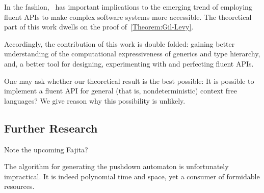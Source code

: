 In the fashion,~ has important
  implications to the emerging trend of employing fluent APIs
  to make complex software systems more accessible.
The theoretical part of this work dwells on the proof of~\cref{Theorem:Gil-Levy}.

Accordingly, the contribution of this work is double folded:
  gaining better understanding of the computational expressiveness of
  \Java generics and type hierarchy, and, a better tool
  for designing, experimenting with and perfecting fluent APIs.

One may ask whether our theoretical result is the
  best possible:
It is possible to implement a fluent API for general
  (that is, nondeterministic) context free languages?
  We give reason why this possibility is unlikely.

\subsection{Further Research}
Note the upcoming \textsf{Fajita}?

The algorithm for generating the pushdown automaton is unfortunately impractical.
It is indeed polynomial time and space,
  yet a consumer of formidable resources.
